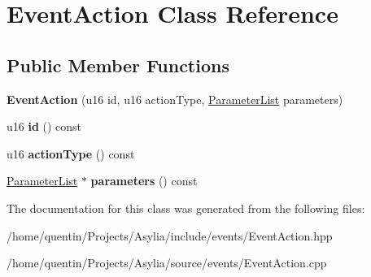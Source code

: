 \hypertarget{classEventAction}{\section{Event\-Action Class Reference}
\label{classEventAction}
}
\subsection*{Public Member Functions}
\begin{DoxyCompactItemize}
\item 
\hypertarget{classEventAction_aa04ec53a586487c198a3d58000750976}{{\bfseries Event\-Action} (u16 id, u16 action\-Type, \hyperlink{classParameterList}{Parameter\-List} parameters)}\label{classEventAction_aa04ec53a586487c198a3d58000750976}

\item 
\hypertarget{classEventAction_ab70d27d5a2e57786ebe428d912c05133}{u16 {\bfseries id} () const }\label{classEventAction_ab70d27d5a2e57786ebe428d912c05133}

\item 
\hypertarget{classEventAction_a46f890b03c020ea0f9e1f7d2f8afdb7e}{u16 {\bfseries action\-Type} () const }\label{classEventAction_a46f890b03c020ea0f9e1f7d2f8afdb7e}

\item 
\hypertarget{classEventAction_a8268d59c8cb784c79365f958db770567}{\hyperlink{classParameterList}{Parameter\-List} $\ast$ {\bfseries parameters} () const }\label{classEventAction_a8268d59c8cb784c79365f958db770567}

\end{DoxyCompactItemize}


The documentation for this class was generated from the following files\-:\begin{DoxyCompactItemize}
\item 
/home/quentin/\-Projects/\-Asylia/include/events/Event\-Action.\-hpp\item 
/home/quentin/\-Projects/\-Asylia/source/events/Event\-Action.\-cpp\end{DoxyCompactItemize}
